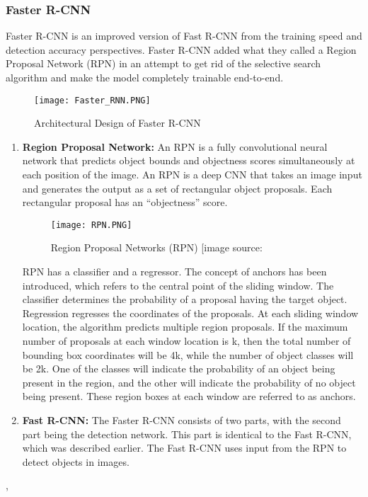 \subsubsection{Faster R-CNN}
Faster R-CNN is an improved version of Fast R-CNN from the training speed and detection accuracy perspectives.
Faster R-CNN added what they called a Region Proposal Network (RPN) in an attempt to get rid of the selective search algorithm and make the model completely trainable end-to-end.

\begin{figure}[H]
    \centering
    \texttt{[image: Faster\_RNN.PNG]}
    \caption{Architectural Design of Faster R-CNN \cite{ansari2020building}}
    \label{fig:Faster R-CNN}
\end{figure}

\begin{enumerate}
    \item \textbf{Region Proposal Network: } An RPN is a fully convolutional neural network that predicts object bounds and objectness scores simultaneously at each position of the image.
    An RPN is a deep CNN that takes an image input and generates the output as a set of rectangular object proposals. Each rectangular proposal has an “objectness” score.
    
    \begin{figure}[H]
        \centering
        \texttt{[image: RPN.PNG]}
        \caption{Region Proposal Networks (RPN) [image source: \cite{chen2018enhanced}}
        \label{fig:RPN}
    \end{figure}
    RPN has a classifier and a regressor. The concept of anchors has been introduced, which refers to the central point of the sliding window.
    The classifier determines the probability of a proposal having the target object. Regression
    regresses the coordinates of the proposals.
    At each sliding window location, the algorithm predicts multiple region proposals. If the maximum number of proposals at each window location is k, then the total number of bounding box coordinates will be 4k, while the number of object classes will be 2k. One of the classes will indicate the probability of an object being present in the region, and the other will indicate the probability of no object being present. These region boxes at each window are referred to as anchors.\\
    \item \textbf{Fast R-CNN: } The Faster R-CNN consists of two parts, with the second part being the detection network. This part is identical to the Fast R-CNN, which was described earlier. The Fast R-CNN uses input from the RPN to detect objects in images.
\end{enumerate} \cite{ansari2020building}, \cite{salvador2016faster}


